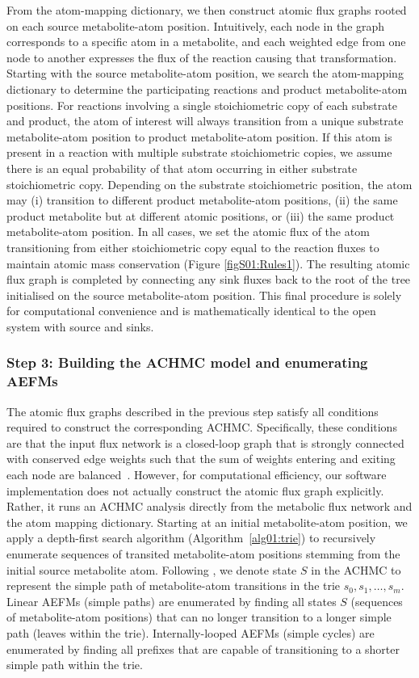 \documentclass[12pt]{article}
\begin{document}
From the atom-mapping dictionary, we then construct atomic flux graphs
rooted on each source metabolite-atom position. Intuitively, each node in
the graph corresponds to a specific atom in a metabolite, and each
weighted edge from one node to another expresses the flux of the reaction
causing that transformation. Starting with the source metabolite-atom
position, we search the atom-mapping dictionary to determine the
participating reactions and product metabolite-atom positions. For
reactions involving a single stoichiometric copy of each substrate and
product, the atom of interest will always transition from a unique
substrate metabolite-atom position to product metabolite-atom position. If
this atom is present in a reaction with multiple substrate stoichiometric
copies, we assume there is an equal probability of that atom occurring in
either substrate stoichiometric copy. Depending on the substrate
stoichiometric position, the atom may (i) transition to different product
metabolite-atom positions, (ii) the same product metabolite but at
different atomic positions, or (iii) the same product metabolite-atom
position. In all cases, we set the atomic flux of the atom transitioning
from either stoichiometric copy equal to the reaction fluxes to maintain
atomic mass conservation (Figure {\ref{figS01:Rules1}}). The resulting
atomic flux graph is completed by connecting any sink fluxes back to the
root of the tree initialised on the source metabolite-atom position. This
final procedure is solely for computational convenience and is
mathematically identical to the open system with source and sinks.

\subsubsection*{Step 3: Building the ACHMC model and enumerating AEFMs}

The atomic flux graphs described in the previous step satisfy all
conditions required to construct the corresponding ACHMC. Specifically,
these conditions are that the input flux network is a closed-loop graph
that is strongly connected with conserved edge weights such that the sum
of weights entering and exiting each node are
balanced~\citep{ChitpinJustinG2023AMct}. However, for computational
efficiency, our software implementation does not actually construct the
atomic flux graph explicitly. Rather, it runs an ACHMC analysis directly
from the metabolic flux network and the atom mapping dictionary. Starting
at an initial metabolite-atom position, we apply a depth-first search
algorithm (Algorithm~{\ref{alg01:trie}}) to recursively enumerate
sequences of transited metabolite-atom positions stemming from the initial
source metabolite atom. Following \citeauthor{ChitpinJustinG2023AMct}, we
denote state $S$ in the ACHMC to represent the simple path of
metabolite-atom transitions in the trie $s_0, s_1, \ldots, s_m$. Linear
AEFMs (simple paths) are enumerated by finding all states $S$ (sequences
of metabolite-atom positions) that can no longer transition to a longer
simple path (leaves within the trie). Internally-looped AEFMs (simple
cycles) are enumerated by finding all prefixes that are capable of
transitioning to a shorter simple path within the trie.
\end{document}

